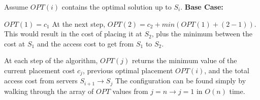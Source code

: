 \documentclass{article}
\begin{document}
Assume $OPT(i)$ contains the optimal solution up to $S_i$. \newline
\textbf{Base Case:}  

$OPT(1) = c_1$
At the next step, $OPT(2) = c_2 + min(OPT(1) + (2 - 1) )$.
This would result in the cost of placing it at $S_2$, plus the minimum between the cost at $S_1$ and the access cost to get from $S_1$ to $S_2$.  

At each step of the algorithm, $OPT(j)$ returns the minimum value of the current placement cost $c_j$, previous optimal placement $OPT(i)$, and the total access cost from servers $S_{i+1} \rightarrow S_j$
The configuration can be found simply by walking through the array of $OPT$ values from $j = n \rightarrow j = 1$ in $O(n)$ time.

\printbibliography
\end{document}
